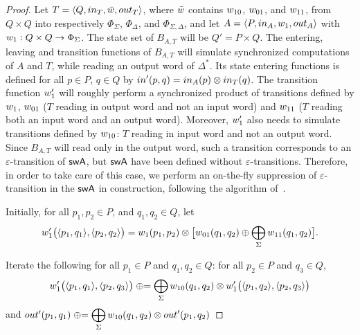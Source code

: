 \begin{proof}
Let $T = \< Q, \init_T, \bar{\wei}, \final_T >$,
where $\bar{\wei}$ contains $\wei_{10}$, $\wei_{01}$, and $\wei_{11}$,
from $Q \times Q$ into respectively 
$\Phi_{\Sigma}$, $\Phi_{\Delta}$, and $\Phi_{\Sigma, \Delta}$,
and let $A = \< P, \init_A, \wei_1, \final_A >$
with $\wei_1: Q \times Q \to \Phi_{\Sigma}$.
%
\noindent
The state set of $B_{A, T}$ will be $Q' = P \times Q$.
The entering, leaving and transition functions of $B_{A, T}$ will 
simulate synchronized computations of $A$ and $T$, 
while reading an output word of $\Delta^*$.
%
Its state entering functions is defined 
for all $p \in P$, $q \in Q$ 
by $\init'(p, q) = \init_A(p) \otimes \init_T(q)$.
The transition function $\wei'_1$ will roughly perform 
a synchronized product of transitions defined by $\wei_1$, 
$\wei_{01}$ ($T$ reading in output word and not an input word)
and $\wei_{11}$ ($T$ reading both an input word and an output word).
%
Moreover, $\wei'_1$ also needs to simulate transitions 
defined by $\wei_{10}$: $T$ reading in input word and not an output word.
Since $B_{A, T}$  will read only in the output word, such a transition corresponds
to an $\varepsilon$-transition of $\textsf{swA}$, 
but $\textsf{swA}$ have been defined without $\varepsilon$-transitions.
Therefore, in order to take care of this case, we perform an on-the-fly
suppression of $\varepsilon$-transition in the $\textsf{swA}$ in construction, 
following the algorithm of~\cite{LombardySakarovitch12ciaa}. 
%


\noindent
Initially, for all $p_1, p_2 \in P$, and $q_1, q_2 \in Q$, let
\[
\wei'_1\bigl( \< p_1, q_1>, \< p_2, q_2>\bigr) = 
\wei_1(p_1, p_2) \otimes
\bigl[
\wei_{01}(q_1, q_2) 
\oplus
\displaystyle\bigoplus_{\Sigma}
\wei_{11}(q_1, q_2) 
\bigr].
\]

\noindent
Iterate the following for all $p_1\in P$ and $q_1, q_2 \in Q$:
for all $p_2\in P$ and $q_3 \in Q$,
\[
\wei'_1\bigl( \< p_1, q_1>, \< p_2, q_3>\bigr) \opluseq 
\displaystyle\bigoplus_{\Sigma} \wei_{10}(q_1, q_2) 
\otimes 
\wei'_1\bigl( \< p_1, q_2>, \< p_2, q_3>\bigr)
\]
and
\(
\final'(p_1, q_1) \opluseq 
\displaystyle\bigoplus_{\Sigma} \wei_{10}(q_1, q_2) 
\otimes \final'(p_1, q_2)
\) 
\end{proof}

